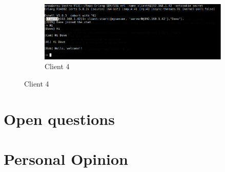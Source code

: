 \documentclass[a4paper, 11pt]{article}
\begin{document}
\begin{figure}[ht]
    \begin{subfigure}[b]{0.8\textwidth}
        \caption{Client 4}
        \includegraphics[width=1.0\textwidth]{figures/Dave.png}
    \end{subfigure}    

\end{figure}

\section{Open questions}


\section{Personal Opinion}

\end{document}
